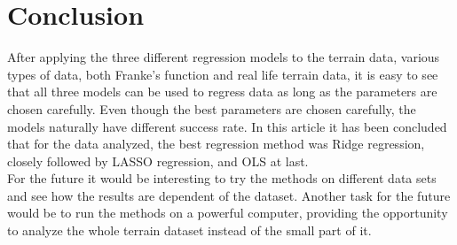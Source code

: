 \documentclass[../main.tex]{subfiles}
\begin{document}
\section{Conclusion}\label{sec:conclusion}
After applying the three different regression models to the terrain data, various types of data, both  Franke's function and real life terrain data, it is easy to see that all three models can be used to regress data as long as the parameters are chosen carefully. Even though the best parameters are chosen carefully, the models naturally have different success rate. In this article it has been concluded that for the data analyzed, the best regression method was Ridge regression, closely followed by LASSO regression, and OLS at last.\\

For the future it would be interesting to try the methods on different data sets and see how the results are dependent of the dataset. Another task for the future would be to run the methods on a powerful computer, providing the opportunity to analyze the whole terrain dataset instead of the small part of it.
\end{document}
